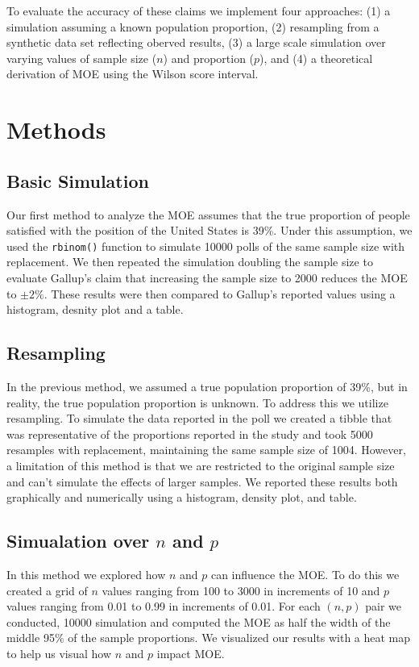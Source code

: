\documentclass{article}\usepackage[]{graphicx}\usepackage[]{xcolor}
\begin{document}
\begin{multicols}{2}
To evaluate the accuracy of these claims we implement four approaches: (1) a simulation assuming a known population proportion, (2) resampling from a synthetic data set reflecting oberved results, (3) a large scale simulation over varying values of sample size ($n$) and proportion ($p$), and (4) a theoretical derivation of MOE using the Wilson score interval. 


\section{Methods}
\subsection{Basic Simulation}
Our first method to analyze the MOE assumes that the true proportion of people satisfied with the position of the United States is 39\%. Under this assumption, we used the \verb|rbinom()| function to simulate 10000 polls of the same sample size with replacement. 
We then repeated the simulation doubling the sample size to evaluate Gallup's claim that increasing the sample size to 2000 reduces the MOE to $\pm 2\%$. These results were then compared to Gallup's reported values using a histogram, desnity plot and a table.

\subsection{Resampling}
In the previous method, we assumed a true population proportion of 39\%, but in reality, the true population proportion is unknown. To address this we utilize resampling. To simulate the data reported in the poll we created a tibble that was representative of the proportions reported in the study and took 5000 resamples with replacement, maintaining the same sample size of 1004. However, a limitation of this method is that we are restricted to the original sample size and can't simulate the effects of larger samples. We reported these results both graphically and numerically using a histogram, density plot, and table.  

\subsection{Simualation over $n$ and $p$}
In this method we explored how $n$ and $p$ can influence the MOE. To do this we created a grid of $n$ values ranging from 100 to 3000 in increments of 10 and $p$ values ranging from 0.01 to 0.99 in increments of 0.01. For each $(n,p)$ pair we conducted, 10000 simulation and computed the MOE as half the width of the middle 95\% of the sample proportions. We visualized our results with a heat map to help us visual how $n$ and $p$ impact MOE.


\end{multicols}
\end{document}
